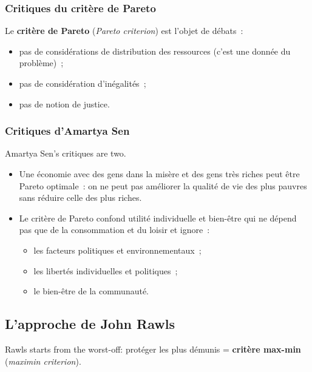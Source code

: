\subsubsection{Critiques du critère de Pareto}

Le \textbf{critère de Pareto} (\textit{Pareto criterion}) est l'objet de débats~:
\begin{itemize}
  \item pas de considérations de distribution des ressources (c'est une donnée du
    problème)~;
  \item pas de considération d'inégalités~;
  \item pas de notion de justice.
\end{itemize}

\subsubsection{Critiques d'Amartya Sen}

Amartya Sen's critiques are two.
\begin{itemize}
  \item Une économie avec des gens dans la misère et des gens très riches peut être
    Pareto optimale~: on ne peut pas améliorer la qualité de vie des plus pauvres
    sans réduire celle des plus riches.
  \item Le critère de Pareto confond utilité individuelle et bien-être qui ne
    dépend pas que de la consommation et du loisir et ignore~:
    \begin{itemize}
      \item les facteurs politiques et environnementaux~;
      \item les libertés individuelles et politiques~;
      \item le bien-être de la communauté.
    \end{itemize}
\end{itemize}

\subsection{L'approche de John Rawls}

Rawls starts from the worst-off: protéger les plus démunis = \textbf{critère
max-min} (\textit{maximin criterion}).\\

